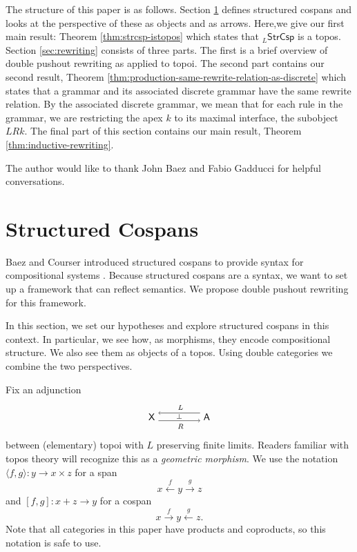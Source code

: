 \documentclass{amsart}
\newcommand{\A}{\cat{A}}
\newcommand{\X}{\cat{X}}
\newcommand{\StrCsp}{\cat{StrCsp}}
\newcommand{\cat}[1]{\mathsf{#1}}
\newcommand{\from}{\colon}
\newcommand{\xto}[1]{\xrightarrow{#1}}
\newcommand{\xgets}[1]{\xleftarrow{#1}}
\newcommand{\spn}[3]{#2 \to #1 \times #3}
\newcommand{\csp}[3]{#1 + #3 \to #2}
\theoremstyle{remark}
\theoremstyle{definition}
\newcommand{\adjunction}[4]{%
  \begin{tikzpicture}[baseline=-3pt]
    \node (1) at (0,0) {\( #1 \)};
    \node (2) at (2,0) {\( #4 \)};
    \draw [->]
    ([yshift= 4pt]2.west) to
    node [above] {\scriptsize{ $ #2 $ }}
    ([yshift= 4pt]1.east);
    \draw [->]
    ([yshift= -4pt]1.east) to
    node [below] {\scriptsize{ $ #3 $ }}
    node [above,yshift= -1.5pt] {\scriptsize{$ \perp $}}
    ([yshift= -4pt]2.west);
  \end{tikzpicture}
}
\begin{document}
The structure of this paper is as follows.  Section
\ref{sec:StrCsp} defines structured cospans and looks at the
perspective of these as objects and as arrows. Here,we give
our first main result: Theorem \ref{thm:strcsp-istopos}
which states that $ _{L}\StrCsp $ is a topos.  Section
\ref{sec:rewriting} consists of three parts.  The first is a
brief overview of double pushout rewriting as applied to
topoi.  The second part contains our second result, Theorem
\ref{thm:production-same-rewrite-relation-as-discrete} which
states that a grammar and its associated discrete grammar
have the same rewrite relation.  By the associated discrete
grammar, we mean that for each rule in the grammar, we are
restricting the apex $ k $ to its maximal interface, the
subobject $ LRk $.  The final part of this section contains
our main result, Theorem \ref{thm:inductive-rewriting}.

The author would like to thank John Baez and Fabio Gadducci
for helpful conversations.


\section{Structured Cospans}
\label{sec:StrCsp}

Baez and Courser introduced structured cospans to provide
syntax for compositional systems \cite{StrCsp}.  Because
structured cospans are a syntax, we want to set up a
framework that can reflect semantics. We propose double
pushout rewriting for this framework.

In this section, we set our hypotheses and explore
structured cospans in this context. In particular, we see
how, as morphisms, they encode compositional structure. We
also see them as objects of a topos. Using double
categories we combine the two perspectives.

Fix an adjunction
%
\[
  \adjunction{\X}{L}{R}{\A}
\]
%
between (elementary) topoi with $ L $ preserving finite
limits. Readers familiar with topos theory will recognize
this as a \emph{geometric morphism}. We use the notation
%
\(
  \langle f,g \rangle \from \spn{x}{y}{z}
\)
% 
for a span
%
\[
  x \xgets{f} y \xto{g} z
\]
%
and
%
\(
  [ f,g ] \from \csp{x}{y}{z}
\)
% 
for a cospan
%
\[
  x \xto{f} y \xgets{g} z.
\]
% 
Note that all categories in this paper have products and
coproducts, so this notation is safe to use.
\end{document}
